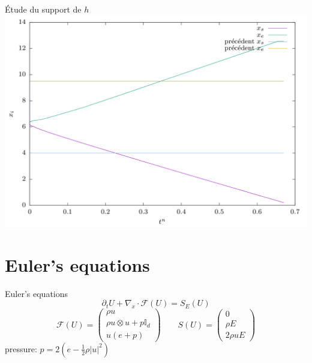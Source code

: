 \documentclass{beamer}
\begin{document}
  \begin{frame}{Étude du support de $h$}
    \includegraphics[width=\textwidth]{img/mimas_test/h_t/xsxe.png}
  \end{frame}

  \section{Euler's equations}
  \begin{frame}{Euler's equations}
  $$
  	\partial_t U + \nabla_x\cdot \mathcal{F}(U) = S_E(U)
	$$
  $$
  \mathcal{F}(U) = \begin{pmatrix}
    \rho u       \\
    \rho u\otimes u + p \mathbb{I}_d \\
    u(e+p)
  \end{pmatrix} \qquad S(U) = \begin{pmatrix} 0 \\ \rho E \\ 2\rho uE \end{pmatrix}
	$$
	pressure: $p = 2(e - \frac{1}{2}\rho |u|^2)$

  \end{frame}
\end{document}
